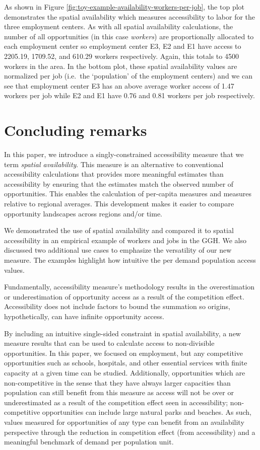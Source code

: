\documentclass[]{elsarticle} %
\begin{document}
As shown in Figure \ref{fig:toy-example-availability-workers-per-job},
the top plot demonstrates the spatial availability which measures
accessibility to labor for the three employment centers. As with all
spatial availability calculations, the number of all opportunities (in
this case \emph{workers}) are proportionally allocated to each
employment center so employment center E3, E2 and E1 have access to
2205.19, 1709.52, and 610.29 workers respectively. Again, this totals to
4500 workers in the area. In the bottom plot, these spatial availability
values are normalized per job (i.e.~the `population' of the employment
centers) and we can see that employment center E3 has an above average
worker access of 1.47 workers per job while E2 and E1 have 0.76 and 0.81
workers per job respectively.

\hypertarget{concluding-remarks}{%
\section{Concluding remarks}\label{concluding-remarks}}

In this paper, we introduce a singly-constrained accessibility measure
that we term \emph{spatial availability}. This measure is an alternative
to conventional accessibility calculations that provides more meaningful
estimates than accessibility by ensuring that the estimates match the
observed number of opportunities. This enables the calculation of
per-capita measures and measures relative to regional averages. This
development makes it easier to compare opportunity landscapes across
regions and/or time.

We demonstrated the use of spatial availability and compared it to
spatial accessibility in an empirical example of workers and jobs in the
GGH. We also discussed two additional use cases to emphasize the
versatility of our new measure. The examples highlight how intuitive the
per demand population access values.

Fundamentally, accessibility measure's methodology results in the
overestimation or underestimation of opportunity access as a result of
the competition effect. Accessibility does not include factors to bound
the summation so origins, hypothetically, can have infinite opportunity
access.

By including an intuitive single-sided constraint in spatial
availability, a new measure results that can be used to calculate access
to non-divisible opportunities. In this paper, we focused on employment,
but any competitive opportunities such as schools, hospitals, and other
essential services with finite capacity at a given time can be studied.
Additionally, opportunities which are non-competitive in the sense that
they have always larger capacities than population can still benefit
from this measure as access will not be over or underestimated as a
result of the competition effect seen in accessibility; non-competitive
opportunities can include large natural parks and beaches. As such,
values measured for opportunities of any type can benefit from an
availability perspective through the reduction in competition effect
(from accessibility) and a meaningful benchmark of demand per population
unit.
\end{document}
